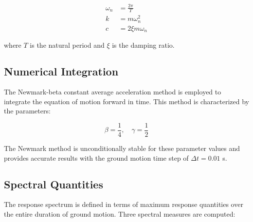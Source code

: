 ﻿\documentclass[12pt]{article}
\begin{document}
\begin{align}
\omega_n &= \frac{2\pi}{T} \label{eq:omega} \\
k &= m \omega_n^2 \label{eq:stiffness} \\
c &= 2 \xi m \omega_n \label{eq:damping}
\end{align}

where \(T\) is the natural period and \(\xi\) is the damping ratio.

\subsection{Numerical Integration}

The Newmark-beta constant average acceleration method is employed to integrate the equation of motion forward in time. This method is characterized by the parameters:

\begin{equation}
\beta = \frac{1}{4}, \quad \gamma = \frac{1}{2}
\end{equation}

The Newmark method is unconditionally stable for these parameter values and provides accurate results with the ground motion time step of \(\Delta t = 0.01\) s.

\subsection{Spectral Quantities}

The response spectrum is defined in terms of maximum response quantities over the entire duration of ground motion. Three spectral measures are computed:
\end{document}
